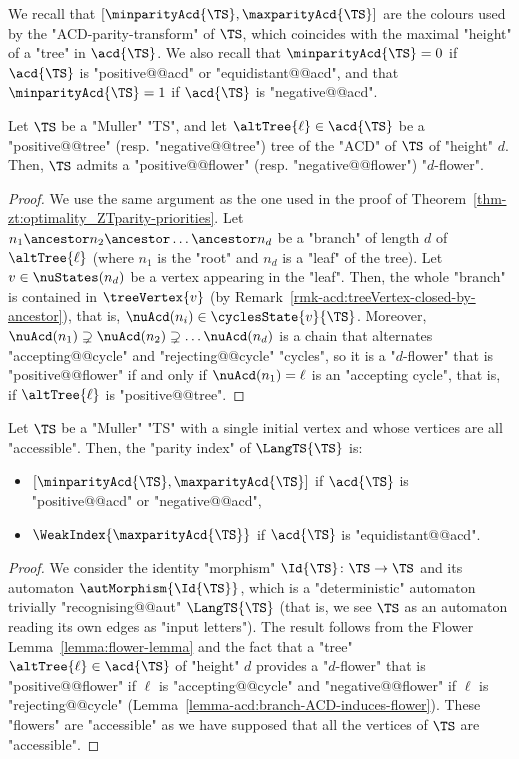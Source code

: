 \documentclass[10pt,a4paper]{amsart}
\begin{document}
We recall that $[\minparityAcd{\TS}, \maxparityAcd{\TS}]$ are the colours used by the "ACD-parity-transform" of $\TS$, which coincides with the maximal "height" of a "tree" in $\acd{\TS}$.
We also recall that $\minparityAcd{\TS}=0$ if $\acd{\TS}$ is "positive@@acd" or "equidistant@@acd", and that $\minparityAcd{\TS}=1$ if $\acd{\TS}$ is "negative@@acd".


\begin{lemma}\label{lemma-acd:branch-ACD-induces-flower}
	Let $\TS$ be a "Muller" "TS", and let $\altTree{\ell}\in \acd{\TS}$ be a "positive@@tree" (resp. "negative@@tree") tree of the "ACD" of $\TS$ of "height" $d$. Then, $\TS$ admits a "positive@@flower" (resp. "negative@@flower") "$d$-flower".
\end{lemma}
\begin{proof}
	We use the same argument as the one used in the proof of Theorem~\ref{thm-zt:optimality_ZTparity-priorities}. Let $n_1\ancestor n_2\ancestor \dots \ancestor n_d$ be a "branch" of length $d$ of $\altTree{\ell}$ (where $n_1$ is the "root" and $n_d$ is a "leaf" of the tree). Let $v\in \nuStates(n_d)$ be a vertex appearing in the "leaf". Then, the whole "branch" is contained in $\treeVertex{v}$ (by Remark~\ref{rmk-acd:treeVertex-closed-by-ancestor}), that is, $\nuAcd(n_i)\in \cyclesState{v}{\TS}$. Moreover, $\nuAcd(n_1)\supsetneq \nuAcd(n_2)\supsetneq \dots \nuAcd(n_d)$ is a chain that alternates "accepting@@cycle" and "rejecting@@cycle" "cycles", so it is a "$d$-flower" that is "positive@@flower" if and only if $\nuAcd(n_1) = \ell$ is an "accepting cycle", that is, if $\altTree{\ell}$ is "positive@@tree".
\end{proof}

\begin{lemma}\label{lemma-acd:parity index-muller-TS}
	Let $\TS$ be a "Muller" "TS" with a single initial vertex and whose vertices are all "accessible". Then, the "parity index" of $\LangTS{\TS}$ is:
	\begin{itemize}
		\item $[\minparityAcd{\TS}, \maxparityAcd{\TS}]$ if $\acd{\TS}$ is "positive@@acd" or "negative@@acd",
		\item $\WeakIndex{\maxparityAcd{\TS}}$ if $\acd{\TS}$ is "equidistant@@acd".
	\end{itemize}
\end{lemma}
\begin{proof}
	We consider the identity "morphism" $\Id{\TS}\colon \TS \to \TS$ and its automaton $\autMorphism{\Id{\TS}}$, which is a "deterministic" automaton trivially "recognising@@aut" $\LangTS{\TS}$ (that is, we see $\TS$ as an automaton reading its own edges as "input letters").
	The result follows from the Flower Lemma~\ref{lemma:flower-lemma} and the fact that a "tree" $\altTree{\ell}\in \acd{\TS}$ of "height" $d$ provides a "$d$-flower" that is "positive@@flower" if $\ell$ is "accepting@@cycle" and "negative@@flower" if  $\ell$ is "rejecting@@cycle" (Lemma~\ref{lemma-acd:branch-ACD-induces-flower}). These "flowers" are "accessible" as we have supposed that all the vertices of $\TS$ are "accessible".
\end{proof}
\end{document}
